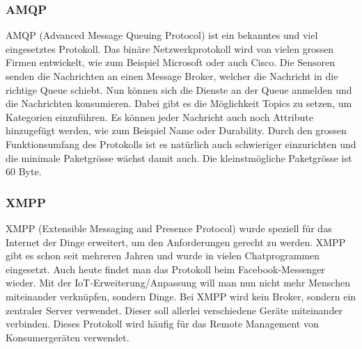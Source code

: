 \subsubsection{AMQP}
AMQP (Advanced Message Queuing Protocol) ist ein bekanntes und viel eingesetztes Protokoll. Das binäre Netzwerkprotokoll wird von vielen grossen Firmen entwickelt, wie zum Beispiel Microsoft oder auch Cisco. Die Sensoren senden die Nachrichten an einen Message Broker, welcher die Nachricht in die richtige Queue schiebt. Nun können sich die Dienste an der Queue anmelden und die Nachrichten konsumieren. Dabei gibt es die Möglichkeit Topics zu setzen, um Kategorien einzuführen. Es können jeder Nachricht auch noch Attribute hinzugefügt werden, wie zum Beispiel Name oder Durability. Durch den grossen Funktionsumfang des Protokolls ist es natürlich auch schwieriger einzurichten und die minimale Paketgrösse wächst damit auch. Die kleinstmögliche Paketgrösse ist 60 Byte.
\subsubsection{XMPP}
XMPP (Extensible Messaging and Presence Protocol) wurde speziell für das Internet der Dinge erweitert, um den Anforderungen gerecht zu werden. XMPP gibt es schon seit mehreren Jahren und wurde in vielen Chatprogrammen eingesetzt. Auch heute findet man das Protokoll beim Facebook-Messenger wieder. Mit der IoT-Erweiterung/Anpassung will man nun nicht mehr Menschen miteinander verknüpfen, sondern Dinge. Bei XMPP wird kein Broker, sondern ein zentraler Server verwendet. Dieser soll allerlei verschiedene Geräte miteinander verbinden. Dieses Protokoll wird häufig für das Remote Management von Konsumergeräten verwendet.

























